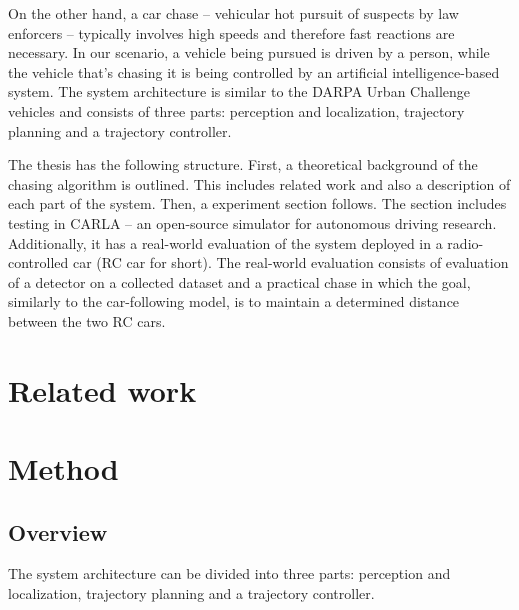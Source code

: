  
On the other hand, a car chase -- vehicular hot pursuit of suspects by law enforcers -- typically involves high speeds and therefore fast reactions are necessary. In our scenario, a vehicle being pursued is driven by a person, while the vehicle that's chasing it is being controlled by an artificial intelligence-based system. The system architecture is similar to the DARPA Urban Challenge vehicles \cite{Bertha}\cite{darpa2}\cite{darpa_book} and consists of three parts: perception and localization, trajectory planning and a trajectory controller. \par


The thesis has the following structure. First, a theoretical background of the chasing algorithm is outlined. This includes related work and also a description of each part of the system. Then, a experiment section follows. The section includes testing in CARLA -- an open-source simulator for autonomous driving research. Additionally, it has a real-world evaluation of the system deployed in a radio-controlled car (RC car for short). The real-world evaluation consists of evaluation of a detector on a collected dataset and a practical chase in which the goal, similarly to the car-following model, is to maintain a determined distance between the two RC cars.

\chapter{Related work}

\chapter{Method}
\section{Overview}
The system architecture can be divided into three parts: perception and localization, trajectory planning and a trajectory controller.\par

